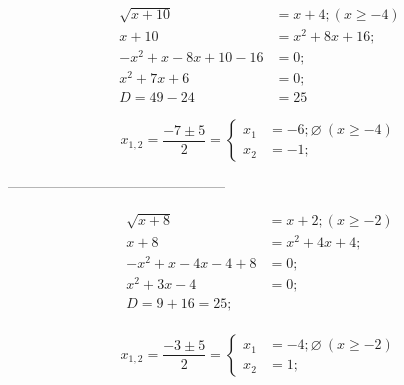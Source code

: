 \documentclass[a4paper,12pt]{article}
\begin{document}
\begin{align*} %
\sqrt{x + 10} &= x + 4; (x \geq -4) \\
x + 10 &= x^2 + 8x + 16; \\
-x^2 + x - 8x + 10 - 16 &= 0; \\
x^2 + 7x + 6 &= 0; \\
D = 49 - 24 &= 25
\end{align*}

\[
x_{1, 2} = \frac{-7 \pm 5}{2} =
\left\{ 
	\begin{aligned}
		x_{1} &= -6; \varnothing ~(x \geq -4) \\
		x_{2} &= -1;
		\end{aligned}
 \right.
\]

\begin{center}
-----------------------------------------------
\end{center}

\begin{align*} %
\sqrt{x + 8} &= x + 2; (x \geq -2) \\
x + 8 &= x^2 + 4x + 4; \\
-x^2 + x - 4x - 4 + 8 &= 0; \\
x^2 + 3x - 4 &= 0; \\
D = 9 + 16 = 25; \\
\end{align*}

\[
x_{1, 2} = \frac{-3 \pm 5}{2} =
\left\{ 
	\begin{aligned}
		x_{1} &= -4; \varnothing ~(x \geq -2) \\
		x_{2} &= 1;
		\end{aligned}
 \right.
\]
\end{document}
